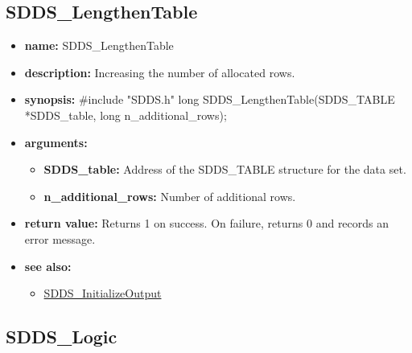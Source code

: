 \documentclass[11pt]{article}
\newcommand{\progref}[1]{\hyperref{SDDS_#1}{{\tt SDDS\_#1} (}{)}{SDDS_#1}}
\begin{document}
\subsection{SDDS\_LengthenTable}
\label{SDDS_LengthenTable}

\begin{itemize}
\item {\bf name:}\newline
SDDS\_LengthenTable
\item {\bf description:}\newline
Increasing the number of allocated rows. 
\item {\bf synopsis:} \#include "SDDS.h"\newline
long SDDS\_LengthenTable(SDDS\_TABLE *SDDS\_table, long n\_additional\_rows);
\item {\bf arguments:}
\begin{itemize}
\item {\bf SDDS\_table:} Address of the SDDS\_TABLE structure for the data set.
\item {\bf n\_additional\_rows:} Number of additional rows.
\end{itemize}
\item {\bf return value:}\newline
Returns 1 on success. On failure, returns 0 and records an error message.
\item {\bf see also:}
\begin{itemize}
\item \progref{InitializeOutput}
\end{itemize}
\end{itemize}

\subsection{SDDS\_Logic}
\label{SDDS_Logic}
\end{document}
